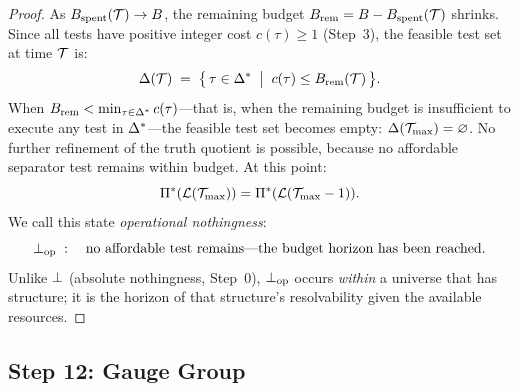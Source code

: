\begin{proof}
As $B_{\mathrm{spent}}(\mathcal{T}) \to B$, the remaining budget
$B_{\mathrm{rem}} = B - B_{\mathrm{spent}}(\mathcal{T})$ shrinks.  Since all
tests have positive integer cost $c(\tau) \geq 1$ (Step~3), the feasible
test set at time $\mathcal{T}$ is:
\[
  \Delta(\mathcal{T}) \;=\; \bigl\{\, \tau \in \Delta^* \;\bigm|\;
    c(\tau) \leq B_{\mathrm{rem}}(\mathcal{T}) \,\bigr\}.
\]
When $B_{\mathrm{rem}} < \min_{\tau \in \Delta^*} c(\tau)$---that is, when
the remaining budget is insufficient to execute any test in $\Delta^*$---the
feasible test set becomes empty: $\Delta(\mathcal{T}_{\max}) = \varnothing$.  No
further refinement of the truth quotient is possible, because no affordable
separator test remains within budget.  At this point:
\[
  \Pi^*(\mathcal{L}(\mathcal{T}_{\max})) = \Pi^*(\mathcal{L}(\mathcal{T}_{\max} - 1)).
\]
We call this state \emph{operational nothingness}:
\[
  \bot_{\mathrm{op}} \;:\quad \text{no affordable test remains---the budget horizon
  has been reached.}
\]
Unlike $\bot$ (absolute nothingness, Step~0), $\bot_{\mathrm{op}}$ occurs \emph{within}
a universe that has structure; it is the horizon of that structure's
resolvability given the available resources.

\end{proof}


\subsection{Step 12: Gauge Group}\label{app:step12}


